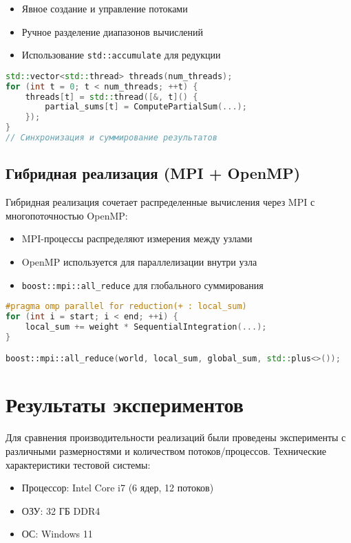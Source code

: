 \documentclass[14pt,a4paper]{extarticle}
\begin{document}
\begin{itemize}
    \item Явное создание и управление потоками
    \item Ручное разделение диапазонов вычислений
    \item Использование \texttt{std::accumulate} для редукции
\end{itemize}

\begin{lstlisting}[language=C++]
std::vector<std::thread> threads(num_threads);
for (int t = 0; t < num_threads; ++t) {
    threads[t] = std::thread([&, t]() {
        partial_sums[t] = ComputePartialSum(...);
    });
}
// Синхронизация и суммирование результатов
\end{lstlisting}

\subsection{Гибридная реализация (MPI + OpenMP)}
Гибридная реализация сочетает распределенные вычисления через MPI с многопоточностью OpenMP:

\begin{itemize}
    \item MPI-процессы распределяют измерения между узлами
    \item OpenMP используется для параллелизации внутри узла
    \item \texttt{boost::mpi::all\_reduce} для глобального суммирования
\end{itemize}

\begin{lstlisting}[language=C++]
#pragma omp parallel for reduction(+ : local_sum)
for (int i = start; i < end; ++i) {
    local_sum += weight * SequentialIntegration(...);
}

boost::mpi::all_reduce(world, local_sum, global_sum, std::plus<>());
\end{lstlisting}
\newpage

\section{Результаты экспериментов}
Для сравнения производительности реализаций были проведены эксперименты с различными размерностями и количеством потоков/процессов. Технические характеристики тестовой системы:

\begin{itemize}
    \item Процессор: Intel Core i7 (6 ядер, 12 потоков)
    \item ОЗУ: 32 ГБ DDR4
    \item ОС: Windows 11
\end{itemize}
\end{document}

